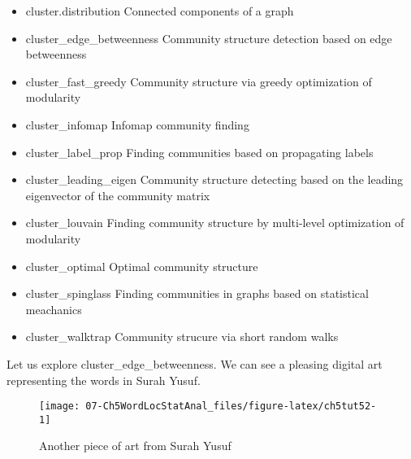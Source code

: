 \documentclass[
]{article}
\newenvironment{Shaded}{\begin{snugshade}}{\end{snugshade}}
\newcommand{\AttributeTok}[1]{\textcolor[rgb]{0.13,0.29,0.53}{#1}}
\newcommand{\ConstantTok}[1]{\textcolor[rgb]{0.56,0.35,0.01}{#1}}
\newcommand{\DecValTok}[1]{\textcolor[rgb]{0.00,0.00,0.81}{#1}}
\newcommand{\FunctionTok}[1]{\textcolor[rgb]{0.13,0.29,0.53}{\textbf{#1}}}
\newcommand{\NormalTok}[1]{#1}
\newcommand{\OtherTok}[1]{\textcolor[rgb]{0.56,0.35,0.01}{#1}}
\newcommand{\SpecialCharTok}[1]{\textcolor[rgb]{0.81,0.36,0.00}{\textbf{#1}}}
\providecommand{\tightlist}{%
  \setlength{\itemsep}{0pt}\setlength{\parskip}{0pt}}
\begin{document}
\begin{itemize}
\tightlist
\item
  cluster.distribution Connected components of a graph
\item
  cluster\_edge\_betweenness Community structure detection based on edge betweenness
\item
  cluster\_fast\_greedy Community structure via greedy optimization of modularity
\item
  cluster\_infomap Infomap community finding
\item
  cluster\_label\_prop Finding communities based on propagating labels
\item
  cluster\_leading\_eigen Community structure detecting based on the leading eigenvector of the community matrix
\item
  cluster\_louvain Finding community structure by multi-level optimization of modularity
\item
  cluster\_optimal Optimal community structure
\item
  cluster\_spinglass Finding communities in graphs based on statistical meachanics
\item
  cluster\_walktrap Community strucure via short random walks
\end{itemize}

Let us explore cluster\_edge\_betweenness. We can see a pleasing digital art representing the words in Surah Yusuf.

\begin{Shaded}
\end{Shaded}

\begin{figure}

{\centering \texttt{[image: 07-Ch5WordLocStatAnal\_files/figure-latex/ch5tut52-1]} 

}

\caption{Another piece of art from Surah Yusuf}\label{fig:ch5tut52}
\end{figure}
\end{document}
